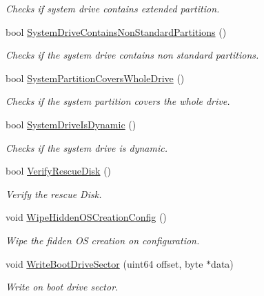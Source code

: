 \begin{DoxyCompactItemize}
\begin{DoxyCompactList}\small\item\em Checks if system drive contains extended partition. \end{DoxyCompactList}\item 
bool \hyperlink{class_gost_crypt_1_1_boot_encryption_a097627633d56bf5421d836d036f6a0e7}{System\+Drive\+Contains\+Non\+Standard\+Partitions} ()
\begin{DoxyCompactList}\small\item\em Checks if the system drive contains non standard partitions. \end{DoxyCompactList}\item 
bool \hyperlink{class_gost_crypt_1_1_boot_encryption_a770514730f74d63e147ea3b2510f5e0f}{System\+Partition\+Covers\+Whole\+Drive} ()
\begin{DoxyCompactList}\small\item\em Checks if the system partition covers the whole drive. \end{DoxyCompactList}\item 
bool \hyperlink{class_gost_crypt_1_1_boot_encryption_a639795ac588f2523a75cc573cc537262}{System\+Drive\+Is\+Dynamic} ()
\begin{DoxyCompactList}\small\item\em Checks if the system drive is dynamic. \end{DoxyCompactList}\item 
bool \hyperlink{class_gost_crypt_1_1_boot_encryption_a4792c6e0ed22b531c34152be522c8106}{Verify\+Rescue\+Disk} ()
\begin{DoxyCompactList}\small\item\em Verify the rescue Disk. \end{DoxyCompactList}\item 
void \hyperlink{class_gost_crypt_1_1_boot_encryption_ab87016e42d7f7826282297e50db00742}{Wipe\+Hidden\+O\+S\+Creation\+Config} ()
\begin{DoxyCompactList}\small\item\em Wipe the fidden OS creation on configuration. \end{DoxyCompactList}\item 
void \hyperlink{class_gost_crypt_1_1_boot_encryption_ac55ac2e6869a99099651444e9e1702b9}{Write\+Boot\+Drive\+Sector} (uint64 offset, byte $\ast$data)
\begin{DoxyCompactList}\small\item\em Write on boot drive sector. \end{DoxyCompactList}\item 

\end{DoxyCompactItemize}
